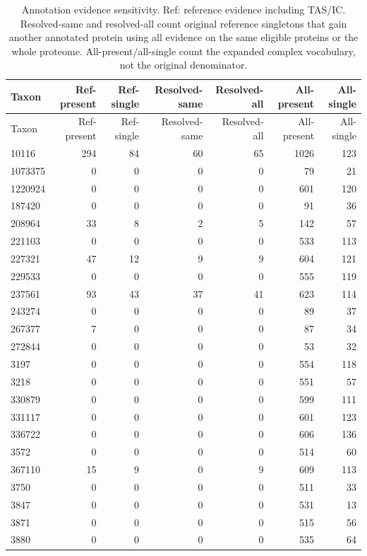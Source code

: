 \begingroup\scriptsize
\setlength{\tabcolsep}{4pt}
\begin{longtable}{lrrrrrr}
\caption{Annotation evidence sensitivity. Ref: reference evidence including TAS/IC. Resolved-same and resolved-all count original reference singletons that gain another annotated protein using all evidence on the same eligible proteins or the whole proteome. All-present/all-single count the expanded complex vocabulary, not the original denominator.}\label{tab:supp-evidence}\\
\toprule
Taxon & Ref-present & Ref-single & Resolved-same & Resolved-all & All-present & All-single \\
\midrule
\endfirsthead
\toprule
Taxon & Ref-present & Ref-single & Resolved-same & Resolved-all & All-present & All-single \\
\midrule
\endhead
10116 & 294 & 84 & 60 & 65 & 1026 & 123 \\
1073375 & 0 & 0 & 0 & 0 & 79 & 21 \\
1220924 & 0 & 0 & 0 & 0 & 601 & 120 \\
187420 & 0 & 0 & 0 & 0 & 91 & 36 \\
208964 & 33 & 8 & 2 & 5 & 142 & 57 \\
221103 & 0 & 0 & 0 & 0 & 533 & 113 \\
227321 & 47 & 12 & 9 & 9 & 604 & 121 \\
229533 & 0 & 0 & 0 & 0 & 555 & 119 \\
237561 & 93 & 43 & 37 & 41 & 623 & 114 \\
243274 & 0 & 0 & 0 & 0 & 89 & 37 \\
267377 & 7 & 0 & 0 & 0 & 87 & 34 \\
272844 & 0 & 0 & 0 & 0 & 53 & 32 \\
3197 & 0 & 0 & 0 & 0 & 554 & 118 \\
3218 & 0 & 0 & 0 & 0 & 551 & 57 \\
330879 & 0 & 0 & 0 & 0 & 599 & 111 \\
331117 & 0 & 0 & 0 & 0 & 601 & 123 \\
336722 & 0 & 0 & 0 & 0 & 606 & 136 \\
3572 & 0 & 0 & 0 & 0 & 514 & 60 \\
367110 & 15 & 9 & 0 & 9 & 609 & 113 \\
3750 & 0 & 0 & 0 & 0 & 511 & 33 \\
3847 & 0 & 0 & 0 & 0 & 531 & 13 \\
3871 & 0 & 0 & 0 & 0 & 515 & 56 \\
3880 & 0 & 0 & 0 & 0 & 535 & 64 \\

\end{longtable}
